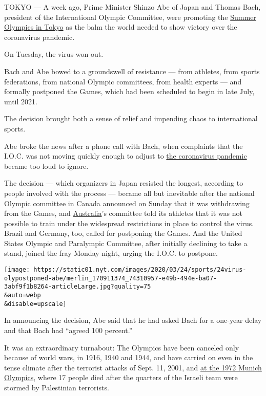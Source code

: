 TOKYO --- A week ago, Prime Minister Shinzo Abe of Japan and Thomas
Bach, president of the International Olympic Committee, were promoting
the
\href{https://www.nytimes.com/2020/07/19/sports/2021-tokyo-olympics-protocols.html}{Summer
Olympics in Tokyo} as the balm the world needed to show victory over the
coronavirus pandemic.

On Tuesday, the virus won out.

Bach and Abe bowed to a groundswell of resistance --- from athletes,
from sports federations, from national Olympic committees, from health
experts --- and formally postponed the Games, which had been scheduled
to begin in late July, until 2021.

The decision brought both a sense of relief and impending chaos to
international sports.

Abe broke the news after a phone call with Bach, when complaints that
the I.O.C. was not moving quickly enough to adjust to
\href{https://www.nytimes.com/2020/03/24/world/coronavirus-updates-maps.html?action=click\&pgtype=Article\&state=default\&module=styln-coronavirus\&variant=show\&region=TOP_BANNER\&context=storyline_menu}{the
coronavirus pandemic} became too loud to ignore.

The decision --- which organizers in Japan resisted the longest,
according to people involved with the process --- became all but
inevitable after the national Olympic committee in Canada announced on
Sunday that it was withdrawing from the Games, and
\href{https://twitter.com/CBCOlympics/status/1242121430554165249?s=20}{Australia}'s
committee told its athletes that it was not possible to train under the
widespread restrictions in place to control the virus. Brazil and
Germany, too, called for postponing the Games. And the United States
Olympic and Paralympic Committee, after initially declining to take a
stand, joined the fray Monday night, urging the I.O.C. to postpone.

\texttt{[image: https://static01.nyt.com/images/2020/03/24/sports/24virus-olypostponed-abe/merlin\_170911374\_74310957-e49b-494e-ba07-3abf9f1b8264-articleLarge.jpg?quality=75\\\&auto=webp\\\&disable=upscale]}

In announcing the decision, Abe said that he had asked Bach for a
one-year delay and that Bach had ``agreed 100 percent.''

It was an extraordinary turnabout: The Olympics have been canceled only
because of world wars, in 1916, 1940 and 1944, and have carried on even
in the tense climate after the terrorist attacks of Sept. 11, 2001, and
\href{https://www.nytimes.com/2015/12/02/sports/long-hidden-details-reveal-cruelty-of-1972-munich-attackers.html}{at
the 1972 Munich Olympics}, where 17 people died after the quarters of
the Israeli team were stormed by Palestinian terrorists.


